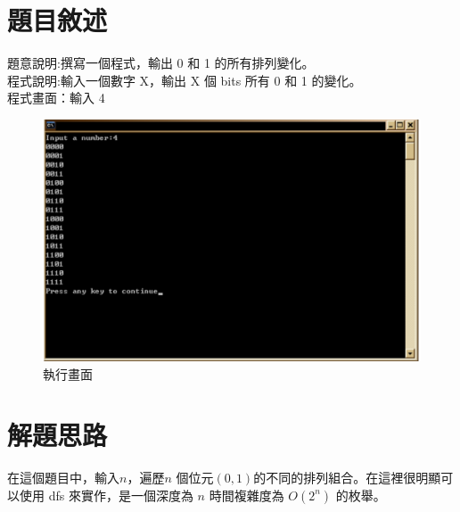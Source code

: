 \documentclass[12pt, a4paper]{article}
\begin{document}
  \section{\fontsize{20pt}{22pt}\selectfont 題目敘述}
  \begin{samepage}
    \fontsize{16pt}{18pt} \selectfont
    題意說明:撰寫一個程式，輸出 0 和 1 的所有排列變化。\\
    程式說明:輸入一個數字 X，輸出 X 個 bits 所有 0 和 1 的變化。\\
    程式畫面：輸入 4 \\
    \begin{figure}[ht]
      \centering
      \includegraphics[width=1.0\textwidth]{../image/question.png}
      \caption{執行畫面}
    \end{figure}  
  \end{samepage}

  \section{\fontsize{20pt}{22pt}\selectfont 解題思路}
  \begin{samepage}
    \fontsize{16pt}{18pt} \selectfont
    在這個題目中，輸入$n$，遍歷$n$ 個位元$(0, 1)$的不同的排列組合。在這裡很明顯可以使用 dfs 來實作，是一個深度為 $n$ 時間複雜度為 $O(2^{n})$ 的枚舉。
    \normalfont
  \end{samepage}
\end{document}
